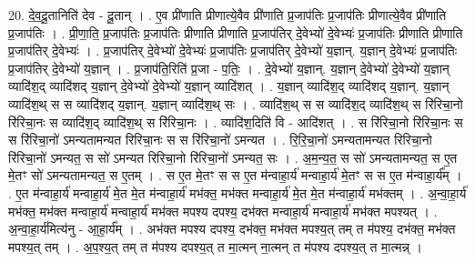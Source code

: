 \documentclass[17pt]{extarticle}
\begin{document}
20. दे॒व॒दू॒तानिति॑ देव - दू॒तान् । . ए॒व प्री॑णाति प्रीणात्ये॒वैव प्री॑णाति प्र॒जाप॑तिः प्र॒जाप॑तिः प्रीणात्ये॒वैव प्री॑णाति प्र॒जाप॑तिः । . प्री॒णा॒ति॒ प्र॒जाप॑तिः प्र॒जाप॑तिः प्रीणाति प्रीणाति प्र॒जाप॑तिर् दे॒वेभ्यो॑ दे॒वेभ्यः॑ प्र॒जाप॑तिः प्रीणाति प्रीणाति प्र॒जाप॑तिर् दे॒वेभ्यः॑ । . प्र॒जाप॑तिर् दे॒वेभ्यो॑ दे॒वेभ्यः॑ प्र॒जाप॑तिः प्र॒जाप॑तिर् दे॒वेभ्यो॑ य॒ज्ञान्. य॒ज्ञान् दे॒वेभ्यः॑ प्र॒जाप॑तिः प्र॒जाप॑तिर् दे॒वेभ्यो॑ य॒ज्ञान् । . प्र॒जाप॑ति॒रिति॑ प्र॒जा - प॒तिः॒ । . दे॒वेभ्यो॑ य॒ज्ञान्. य॒ज्ञान् दे॒वेभ्यो॑ दे॒वेभ्यो॑ य॒ज्ञान् व्यादि॑श॒द् व्यादि॑शद् य॒ज्ञान् दे॒वेभ्यो॑ दे॒वेभ्यो॑ 
य॒ज्ञान् व्यादि॑शत् । . य॒ज्ञान् व्यादि॑श॒द् व्यादि॑शद् य॒ज्ञान्. य॒ज्ञान् व्यादि॑श॒थ् स स व्यादि॑शद् य॒ज्ञान्. य॒ज्ञान् व्यादि॑श॒थ् सः । . व्यादि॑श॒थ् स स व्यादि॑श॒द् व्यादि॑श॒थ् स रि॑रिचा॒नो रि॑रिचा॒नः स व्यादि॑श॒द् व्यादि॑श॒थ् स रि॑रिचा॒नः । . व्यादि॑श॒दिति॑ वि - आदि॑शत् । . स रि॑रिचा॒नो रि॑रिचा॒नः स स रि॑रिचा॒नो॑ ऽमन्यतामन्यत रिरिचा॒नः स स रि॑रिचा॒नो॑ ऽमन्यत । . रि॒रि॒चा॒नो॑ ऽमन्यतामन्यत रिरिचा॒नो रि॑रिचा॒नो॑ ऽमन्यत॒ स सो॑ ऽमन्यत रिरिचा॒नो रि॑रिचा॒नो॑ ऽमन्यत॒ सः । . अ॒म॒न्य॒त॒ स सो॑ ऽमन्यतामन्यत॒ स ए॒त मे॒तꣳ सो॑ ऽमन्यतामन्यत॒ स ए॒तम् । . स ए॒त मे॒तꣳ स स ए॒त म॑न्वाहा॒र्य॑ मन्वाहा॒र्य॑ मे॒तꣳ स स ए॒त म॑न्वाहा॒र्य᳚म् । . ए॒त म॑न्वाहा॒र्य॑ मन्वाहा॒र्य॑ मे॒त मे॒त म॑न्वाहा॒र्य॑ मभ॑क्त॒ मभ॑क्त मन्वाहा॒र्य॑ मे॒त मे॒त म॑न्वाहा॒र्य॑ मभ॑क्तम् । . अ॒न्वा॒हा॒र्य॑ मभ॑क्त॒ मभ॑क्त मन्वाहा॒र्य॑ मन्वाहा॒र्य॑ मभ॑क्त मपश्य दपश्य॒ दभ॑क्त मन्वाहा॒र्य॑ मन्वाहा॒र्य॑ मभ॑क्त मपश्यत् । . अ॒न्वा॒हा॒र्य॑मित्य॑नु - आ॒हा॒र्य᳚म् । . अभ॑क्त मपश्य दपश्य॒ दभ॑क्त॒ मभ॑क्त मपश्य॒त् तम् त म॑पश्य॒ दभ॑क्त॒ मभ॑क्त मपश्य॒त् तम् । . अ॒प॒श्य॒त् तम् त म॑पश्य दपश्य॒त् त मा॒त्मन् ना॒त्मन् त म॑पश्य दपश्य॒त् त मा॒त्मन्न् । \newline
\end{document}
